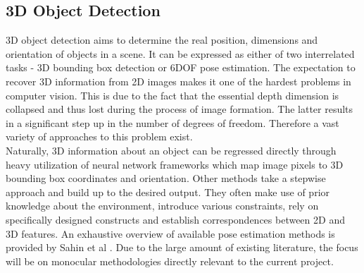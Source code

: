 \documentclass[main.tex]{subfiles}
\begin{document}
\subsection{3D Object Detection}
\indent 3D object detection aims to determine the real position, dimensions and orientation of objects in a scene. It can be expressed as either of two interrelated tasks - 3D bounding box detection or 6DOF pose estimation. The expectation to recover 3D information from 2D images makes it one of the hardest problems in computer vision. This is due to the fact that the essential depth dimension is collapsed and thus lost during the process of image formation. The latter results in a significant step up in the number of degrees of freedom. Therefore a vast variety of approaches to this problem exist.\\
\indent Naturally, 3D information about an object can be regressed directly through heavy utilization of neural network frameworks which map image pixels to 3D bounding box coordinates and orientation. Other methods take a stepwise approach and build up to the desired output. They often make use of prior knowledge about the environment, introduce various constraints, rely on specifically designed constructs and establish correspondences between 2D and 3D features. An exhaustive overview of available pose estimation methods is provided by Sahin et al \cite{Sahin2020}. Due to the large amount of existing literature, the focus will be on monocular methodologies directly relevant to the current project.
\end{document}
